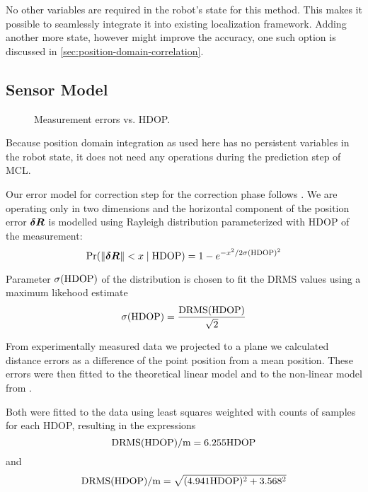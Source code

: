 No other variables are required in the robot's state for this method.
This makes it possible to seamlessly integrate it into existing localization framework.
Adding another more state, however might improve the accuracy, one such option
is discussed in \cref{sec:position-domain-correlation}.

\subsection{Sensor Model}
\label{sec:wgs84-hdop-error}

\begin{figure}[htp]
	\centering
	\noindent{}
	\caption{Measurement errors vs. HDOP.}
	\label{fig:wgs84-hdop-error}
\end{figure}

Because position domain integration as used here has no persistent variables in the
robot state, it does not need any operations during the prediction step of MCL.

Our error model for correction step for the correction phase follows \cite{www-wilson}.
We are operating only in two dimensions and
the horizontal component of the position error  \(\bm{\delta R}\) is modelled using Rayleigh distribution
parameterized with HDOP of the measurement:
\begin{equation}
	\operatorname{\mathrm{Pr}}(\lVert\bm{\delta R}\rVert < x \mid \mathrm{HDOP}) =
		1 - e^{-x^2/2\sigma(\mathrm{HDOP})^2}
\end{equation}

Parameter \(\sigma(\mathrm{HDOP})\) of the distribution is chosen to fit the DRMS values using a maximum likehood estimate
\begin{equation}
	\sigma(\mathrm{HDOP}) = \frac{\mathrm{DRMS}(\mathrm{HDOP})}{\sqrt{2}}
\end{equation}

From experimentally measured data we projected to a plane we calculated
distance errors as a difference of the point position from a mean position.
These errors were then fitted to the theoretical linear model and to
the non-linear model from \cite{www-wilson}.

Both were fitted to the data using least squares weighted with counts of samples
for each HDOP, resulting in the expressions
\begin{equation}
\mathrm{DRMS}(\mathrm{HDOP}) / \si{\meter} = \num{6.255} \mathrm{HDOP}
\end{equation}
and
\begin{equation}
\mathrm{DRMS}(\mathrm{HDOP}) / \si{\meter} = \sqrt{(\num{4.941}\mathrm{HDOP})^2 + \num{3.568}^2}
\end{equation}

